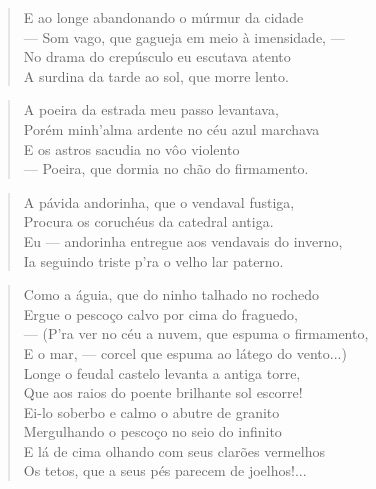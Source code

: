 \begin{anexosenv}
\begin{verse}
E ao longe abandonando o múrmur da cidade \\
— Som vago, que gagueja em meio à imensidade, — \\
No drama do crepúsculo eu escutava atento \\
A surdina da tarde ao sol, que morre lento. \\
\end{verse}

\begin{verse}
A poeira da estrada meu passo levantava, \\
Porém minh'alma ardente no céu azul marchava \\
E os astros sacudia no vôo violento \\
— Poeira, que dormia no chão do firmamento. \\
\end{verse}

\begin{verse}
A pávida andorinha, que o vendaval fustiga, \\
Procura os coruchéus da catedral antiga. \\
Eu — andorinha entregue aos vendavais do inverno, \\
Ia seguindo triste p'ra o velho lar paterno. \\
\end{verse}

\begin{verse}
Como a águia, que do ninho talhado no rochedo \\
Ergue o pescoço calvo por cima do fraguedo, \\
— (P'ra ver no céu a nuvem, que espuma o firmamento, \\
E o mar, — corcel que espuma ao látego do vento...) \\
Longe o feudal castelo levanta a antiga torre, \\
Que aos raios do poente brilhante sol escorre! \\
Ei-lo soberbo e calmo o abutre de granito \\
Mergulhando o pescoço no seio do infinito \\
E lá de cima olhando com seus clarões vermelhos \\
Os tetos, que a seus pés parecem de joelhos!... \\
\end{verse}


\end{anexosenv}
